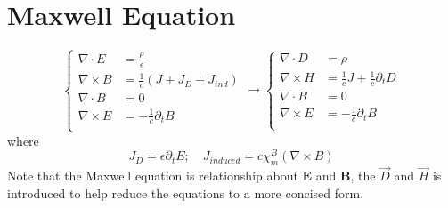 \section{Maxwell Equation}
\begin{equation}
    \label{eqn:Maxwell}
    \left\{
    \begin{aligned}
	\nabla\cdot{E} &= \frac{\rho}{\epsilon}	\\
	\nabla\times{B} &= \frac{1}{c}\left(J + J_D + J_{ind}\right)	\\
	\nabla\cdot{B} &= 0  \\
	\nabla\times{E} &= -\frac{1}{c}\partial_{t}B	\\
    \end{aligned}
    \right.
    \longrightarrow
    \left\{
    \begin{aligned}
	\nabla\cdot{D} &= \rho	\\
	\nabla\times{H} &= \frac{1}{c}J +\frac{1}{c}\partial_{t}D    \\
	\nabla\cdot{B} &= 0  \\
	\nabla\times{E} &= -\frac{1}{c}\partial_{t}B	\\
    \end{aligned}
    \right.
\end{equation}
where 
\[J_D = \epsilon\partial_{t}E; \quad J_{induced} = c\chi_m^B(\nabla\times{B})\]
Note that the Maxwell equation is relationship about $\mathbf{E}$ and
$\mathbf{B}$, the $\vec{D}$ and $\vec{H}$ is introduced to help reduce the
equations to a more concised form. 

